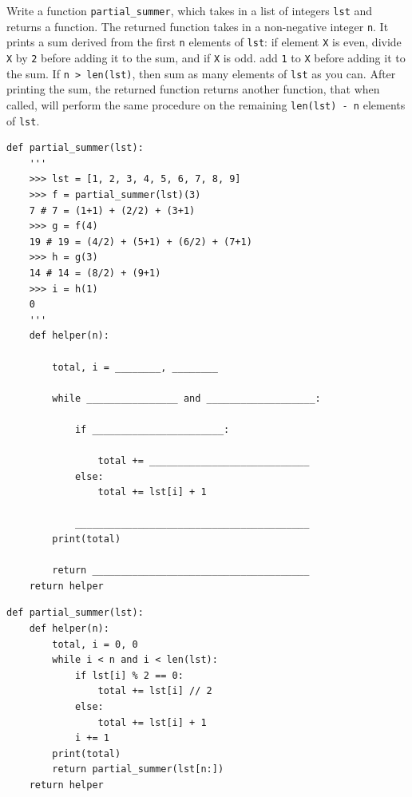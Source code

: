 \begin{blocksection}
\question Write a function \lstinline{partial_summer}, which takes in a list of integers \lstinline{lst} and returns a function. The returned function takes in a non-negative integer \lstinline{n}. It prints a sum derived from the first \lstinline{n} elements of \lstinline{lst}: if element \texttt{X} is even, divide \texttt{X} by \lstinline{2} before adding it to the sum, and if \texttt{X} is odd. add \lstinline{1} to \texttt{X} before adding it to the sum. If \lstinline{n > len(lst)}, then sum as many elements of \lstinline{lst} as you can. After printing the sum, the returned function returns another function, that when called, will perform the same procedure on the remaining \lstinline{len(lst) - n} elements of \lstinline{lst}. \\

\begin{lstlisting}
def partial_summer(lst):
    '''
    >>> lst = [1, 2, 3, 4, 5, 6, 7, 8, 9]
    >>> f = partial_summer(lst)(3)
    7 # 7 = (1+1) + (2/2) + (3+1)
    >>> g = f(4)
    19 # 19 = (4/2) + (5+1) + (6/2) + (7+1)
    >>> h = g(3)
    14 # 14 = (8/2) + (9+1)
    >>> i = h(1)
    0	
    '''
    def helper(n):

        total, i = ________, ________

        while ________________ and ___________________:

            if _______________________:

                total += ____________________________
            else:
                total += lst[i] + 1
            
            _________________________________________
        print(total)

        return ______________________________________
    return helper
\end{lstlisting}
\end{blocksection}
\begin{blocksection}
\begin{solution}
\begin{lstlisting}
def partial_summer(lst):
    def helper(n):
        total, i = 0, 0
        while i < n and i < len(lst):
            if lst[i] % 2 == 0:
                total += lst[i] // 2
            else:
                total += lst[i] + 1
            i += 1
        print(total)
        return partial_summer(lst[n:])
    return helper
\end{lstlisting}
\end{solution}
\end{blocksection}